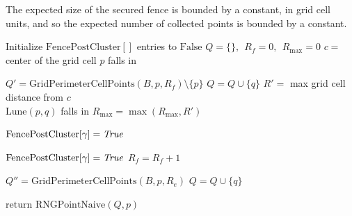 \documentclass[a4paper,fleqn]{cas-dc}
\begin{document}
The expected size of the secured fence is bounded by a constant, in grid cell units,
and so the expected number of collected points is bounded by
a constant.


\begin{algorithm}
  \caption{Single point Relative Neighborhood Graph, Secure Posts on Increasing Fence}\label{alg:RNGpSPoIF}
  \begin{algorithmic}[1]

      \State Initialize $\text{FencePostCluster}[]$ entries to $\text{False}$
      \State $Q = \{\}, \ \ R _f = 0, \ \ R _ {\text{max}} = 0$
      \State $c = $ center of the grid cell $p$ falls in

        \State $Q' = \text{GridPerimeterCellPoints}(B, p, R_f) \setminus \{p\}$
          \State $Q = Q \cup \{q\}$
          \State $R' =$ max grid cell distance from $c$ \\
          \hspace{6.5em} $\text{Lune}(p,q)$ falls in
          \State $R _ {\text{max}} = \max(R_{\text{max}}, R')$
        \EndFor

            \State $\text{FencePostCluster}[\gamma] = \text{\emph{True}}$
          \EndIf
        \EndFor

              \State $\text{FencePostCluster}[\gamma] = \text{\emph{True}}$
            \EndIf
          \EndFor
        \EndFor
        \State $R _ f = R _ f + 1 $
      \EndWhile

        \State $Q'' = \text{GridPerimeterCellPoints}(B, p, R_e)$
          \State $Q = Q \cup \{q\}$
        \EndFor
      \EndFor

      \State $\text{return } \text{RNGPointNaive}( Q, p )$

    \EndProcedure
  \end{algorithmic}
\end{algorithm}
\end{document}
